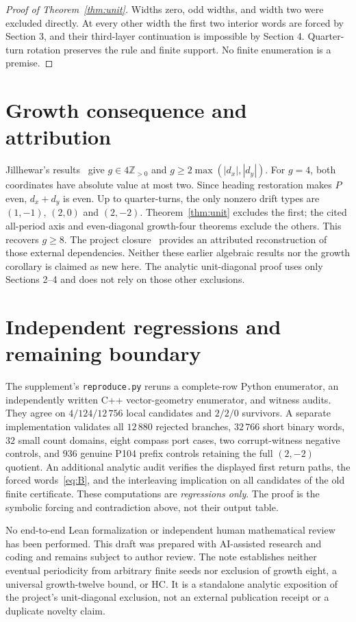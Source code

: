 \documentclass[11pt]{article}
\newcommand{\Z}{\mathbb Z}
\begin{document}
\begin{proof}[Proof of Theorem~\ref{thm:unit}]
Widths zero, odd widths, and width two were excluded directly. At every
other width the first two interior words are forced by Section 3, and their
third-layer continuation is impossible by Section 4. Quarter-turn rotation
preserves the rule and finite support. No finite enumeration is a premise.
\end{proof}

\section{Growth consequence and attribution}
Jillhewar's results~\cite{J} give $g\in4\Z_{>0}$ and
$g\ge2\max(|d_x|,|d_y|)$. For $g=4$, both coordinates have absolute value at
most two. Since heading restoration makes $P$ even, $d_x+d_y$ is even.
Up to quarter-turns, the only nonzero drift types are $(1,-1)$, $(2,0)$ and
$(2,-2)$. Theorem~\ref{thm:unit} excludes the first; the cited all-period
axis and even-diagonal growth-four theorems exclude the others. This recovers
$g\ge8$. The project closure~\cite{C} provides an attributed reconstruction
of those external dependencies. Neither these earlier algebraic results nor
the growth corollary is claimed as new here. The analytic unit-diagonal proof
uses only Sections 2--4 and does not rely on those other exclusions.

\section{Independent regressions and remaining boundary}
The supplement's \texttt{reproduce.py} reruns a complete-row Python enumerator,
an independently written C++ vector-geometry enumerator, and witness audits.
They agree on $4/124/12\,756$ local candidates and $2/2/0$ survivors. A separate
implementation validates all $12\,880$ rejected branches, $32\,766$ short binary
words, $32$ small count domains, eight compass port cases, two corrupt-witness
negative controls, and $936$ genuine P104 prefix controls retaining the full
$(2,-2)$ quotient. An additional analytic audit verifies the displayed first
return paths, the forced words~\eqref{eq:B}, and the interleaving implication
on all candidates of the old finite certificate. These computations are
\emph{regressions only}. The proof is the symbolic forcing and contradiction
above, not their output table.

No end-to-end Lean formalization or independent human mathematical review has
been performed. This draft was prepared with AI-assisted research and coding
and remains subject to author review. The note establishes neither eventual
periodicity from arbitrary finite seeds nor exclusion of growth eight, a
universal growth-twelve bound, or HC. It is a standalone analytic exposition
of the project's unit-diagonal exclusion, not an external publication receipt
or a duplicate novelty claim.
\end{document}
